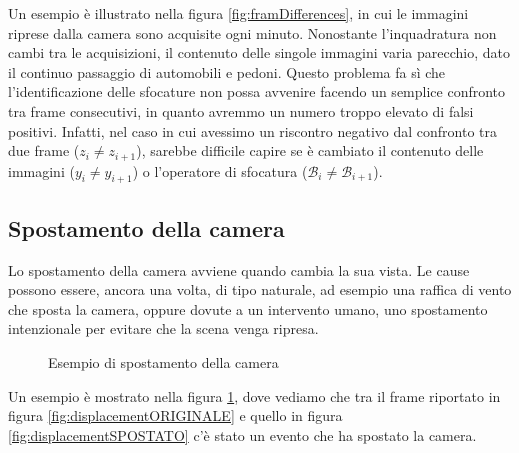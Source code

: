 \noindent Un esempio \`e illustrato nella figura \ref{fig:framDifferences}, in cui le immagini riprese dalla camera sono acquisite ogni minuto. 
Nonostante l'inquadratura non cambi tra le acquisizioni, il contenuto delle singole immagini varia parecchio, dato il continuo passaggio di automobili e pedoni.
Questo problema fa s\`i che l'identificazione delle sfocature non possa avvenire facendo un semplice confronto tra frame consecutivi, in quanto avremmo un numero troppo elevato di falsi positivi.
Infatti, nel caso in cui avessimo un riscontro negativo dal confronto tra due frame ($z_i \neq z_{i + 1}$), sarebbe difficile capire se \`e cambiato il contenuto delle immagini ($y_i \neq y_{i + 1}$) o l'operatore di sfocatura ($\mathcal{B}_i \neq \mathcal{B}_{i + 1}$). 
\subsection{Spostamento della camera}
Lo spostamento della camera avviene quando cambia la sua vista.
Le cause possono essere, ancora una volta, di tipo naturale, ad esempio una raffica di vento che sposta la camera, oppure dovute a un intervento umano, uno spostamento intenzionale per evitare che la scena venga ripresa.
\begin{figure}
	\centering
	\caption{Esempio di spostamento della camera}
	\label{fig:testiDISPLACEMENT}
\end{figure}
\noindent Un esempio \`e mostrato nella figura \ref{fig:testiDISPLACEMENT}, dove vediamo che tra il frame riportato in figura \ref{fig:displacementORIGINALE} e quello in figura \ref{fig:displacementSPOSTATO} c'\`e stato un evento che ha spostato la camera.
